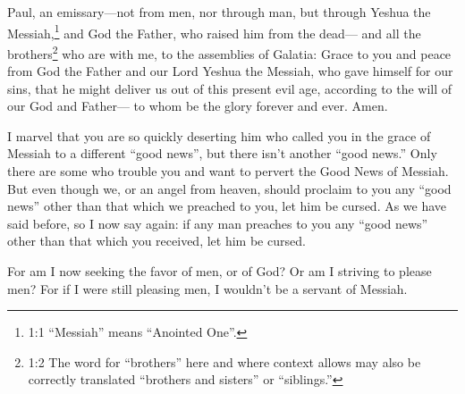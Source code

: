 






\vspace{-1.36in}

\mychapter{} \myverse*{}Paul, an emissary—not from men, nor through man, but through Yeshua the Messiah,\footnote{1:1 “Messiah” means “Anointed One”.} and God the Father, who raised him from the dead—
\myverse{}and all the brothers\footnote{1:2 The word for “brothers” here and where context allows may also be correctly translated “brothers
	and sisters” or “siblings.”
} who are with me, to the assemblies of Galatia:
\myverse{}Grace to you and peace from God the Father and our Lord Yeshua the Messiah,
\myverse{}who gave himself for our sins, that he might deliver us out of this present
evil age, according to the will of our God and Father—
\myverse{}to whom be the glory forever and ever. Amen.

\myverse{}I marvel that you are so quickly deserting him who called you in
the grace of Messiah to a different “good news”,
\myverse{}but there isn’t another “good news.” Only there are some who trouble you and
want to pervert the Good News of Messiah.
\myverse{}But even though we, or an angel from heaven, should proclaim to you any “good
news” other than that which we preached to you, let him be cursed.
\myverse{}As we have said before, so I now say again: if any man preaches to you any “good
news” other than that which you received, let him be cursed.

\myverse{}For am I now seeking the favor of men, or of God? Or am I striving
to please men? For if I were still pleasing men, I wouldn’t be a servant of Messiah.

